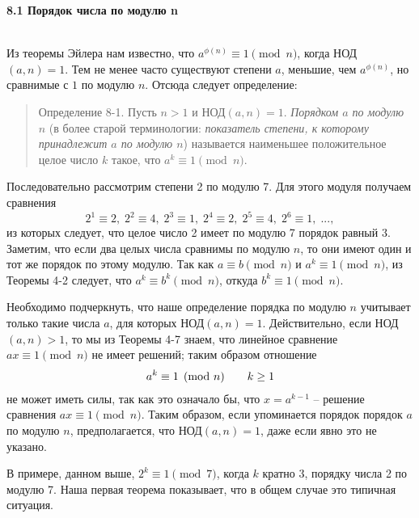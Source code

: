 \documentclass[11pt]{article}
\begin{document}
	
\begin{Large}\textbf{8.1 Порядок числа по модулю n} \end{Large}\\
\pagestyle{style}
Из теоремы Эйлера нам известно, что $a^{\phi(n)}\equiv 1\pmod{n}$, когда НОД$(a,n)=1$. Тем не менее часто существуют степени $a$, меньшие, чем $a^{\phi(n)}$, но сравнимые с $1$ по модулю $n$. Отсюда следует определение:
\begin{quote}
	\large{Определение 8-1}. Пусть $n>1$ и НОД$(a,n)=1$. \emph {Порядком $a$ по модулю $n$} (в более старой терминологии: \emph{показатель степени, к которому принадлежит $a$ по модулю $n$}) называется наименьшее положительное целое число $k$ такое, что $a^k\equiv 1\pmod{n}$.
\end{quote}

Последовательно рассмотрим степени 2 по модулю 7. Для этого модуля получаем сравнения $$2^1\equiv2,\; 2^2\equiv4,\; 2^3\equiv1,\; 2^4\equiv2,\; 2^5\equiv4,\; 2^6\equiv1,\; ...,$$ из которых следует, что целое число 2 имеет по модулю 7 порядок равный 3.\\

Заметим, что если два целых числа сравнимы по модулю $n$, то они имеют один и тот же порядок по этому модулю. Так как $a\equiv b\pmod{n}$ и $a^k\equiv 1\pmod{n}$, из Теоремы 4-2 следует, что $a^k\equiv b^k\pmod{n}$, откуда $b^k\equiv 1\pmod{n}$.

Необходимо подчеркнуть, что наше определение порядка по модулю $n$ учитывает только такие числа $a$, для которых НОД$(a,n)=1$. Действительно, если НОД$(a,n)>1$, то мы из Теоремы 4-7 знаем, что линейное сравнение $ax\equiv1\pmod{n}$ не имеет решений; таким образом отношение
\begin{align}
a^k\equiv1 \pmod{n}\tag*{$k\geq{1}$}
\end{align}
не может иметь силы, так как это означало бы, что $x=a^{k-1}$ -- решение сравнения $ax\equiv 1\pmod{n}$. Таким образом, если упоминается порядок порядок $a$ по модулю $n$, предполагается, что НОД$(a,n)=1$, даже если явно это не указано.

В примере, данном выше, $2^k\equiv1\pmod{7}$, когда $k$ кратно 3, порядку числа 2 по модулю 7. Наша первая теорема показывает, что в общем случае это типичная ситуация.
\end{document}
